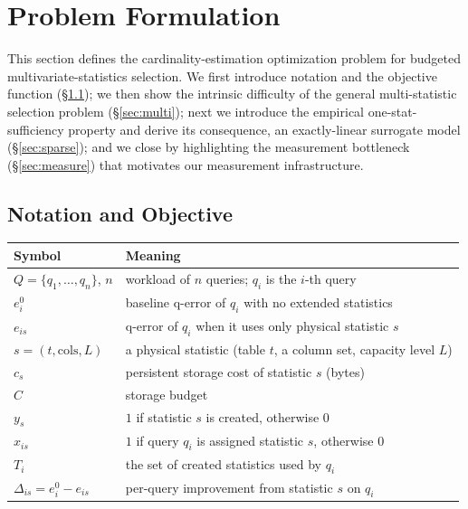 \documentclass[sigconf, nonacm]{acmart}
\begin{document}
\section{Problem Formulation}
\label{sec:formulation}

This section defines the cardinality-estimation optimization problem for
budgeted multivariate-statistics selection. We first introduce notation and the
objective function (\S\ref{sec:notn}); we then show the intrinsic difficulty of
the general multi-statistic selection problem (\S\ref{sec:multi}); next we
introduce the empirical one-stat-sufficiency property and derive its
consequence, an exactly-linear surrogate model (\S\ref{sec:sparse}); and we
close by highlighting the measurement bottleneck (\S\ref{sec:measure}) that
motivates our measurement infrastructure.

\subsection{Notation and Objective}
\label{sec:notn}

\begin{center}\small
\begin{tabular}{@{}l@{\hspace{1.2em}}p{}@{}}
\toprule
Symbol & Meaning\\
\midrule
$Q=\{q_1,\dots,q_n\}$, $n$ & workload of $n$ queries; $q_i$ is the $i$-th query\\
$e_i^0$ & baseline q-error of $q_i$ with no extended statistics\\
$e_{is}$ & q-error of $q_i$ when it uses only physical statistic $s$\\
$s=(t,\mathrm{cols},L)$ & a physical statistic (table $t$, a column set, capacity level $L$)\\
$c_s$ & persistent storage cost of statistic $s$ (bytes)\\
$C$ & storage budget\\
$y_s$ & $1$ if statistic $s$ is created, otherwise $0$\\
$x_{is}$ & $1$ if query $q_i$ is assigned statistic $s$, otherwise $0$\\
$T_i$ & the set of created statistics used by $q_i$\\
$\Delta_{is}=e_i^0-e_{is}$ & per-query improvement from statistic $s$ on $q_i$\\
\bottomrule
\end{tabular}
\end{center}
\end{document}
